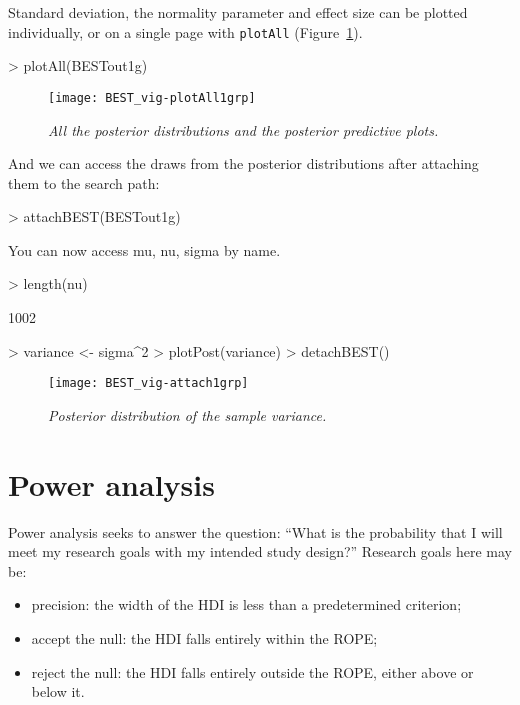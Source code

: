 \documentclass[a4paper]{article}
\begin{document}
Standard deviation, the normality parameter and effect size can be plotted individually, or on a single page with \texttt{plotAll} (Figure~\ref{fig:plotAll1g}).

\begin{Schunk}
\begin{Sinput}
> plotAll(BESTout1g)
\end{Sinput}
\end{Schunk}
\begin{figure}[bht]
  \centering
  \texttt{[image: BEST\_vig-plotAll1grp]}
  \caption{\it All the posterior distributions and the posterior predictive plots.}
  \label{fig:plotAll1g}
\end{figure}

And we can access the draws from the posterior distributions after attaching them to the search path:

\begin{Schunk}
\begin{Sinput}
> attachBEST(BESTout1g)
\end{Sinput}
\begin{Soutput}
You can now access mu, nu, sigma by name.
\end{Soutput}
\begin{Sinput}
> length(nu)
\end{Sinput}
\begin{Soutput}
[1] 1002
\end{Soutput}
\begin{Sinput}
> variance <- sigma^2
> plotPost(variance)
> detachBEST()
\end{Sinput}
\end{Schunk}
\begin{figure}[H]
  \centering
  \texttt{[image: BEST\_vig-attach1grp]}
  \caption{\it Posterior distribution of the sample variance.}
  \label{fig:var1g}
\end{figure}


\section{Power analysis}
\label{sec:power}

Power analysis seeks to answer the question: ``What is the probability that I will meet my research goals with my intended study design?'' Research goals here may be:
\begin{itemize}
  \item precision: the width of the HDI is less than a predetermined criterion;
  \item accept the null: the HDI falls entirely within the ROPE;
  \item reject the null: the HDI falls entirely outside the ROPE, either above or below it.
\end{itemize}
\end{document}
